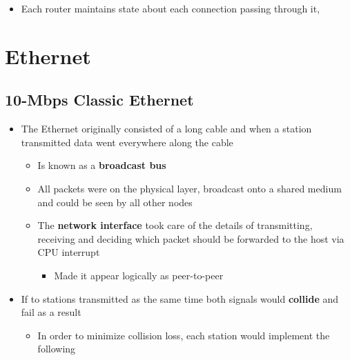 \documentclass[11pt]{article}
\providecommand{\tightlist}{%
      \setlength{\itemsep}{0pt}\setlength{\parskip}{0pt}}
\begin{document}
\begin{itemize}
  \begin{itemize}
  \tightlist
  \item
    Each router maintains state about each connection passing through
    it,
  \end{itemize}
\end{itemize}

    \section{Ethernet}\label{ethernet}

    \subsection{10-Mbps Classic Ethernet}\label{mbps-classic-ethernet}

\begin{itemize}
\tightlist
\item
  The Ethernet originally consisted of a long cable and when a station
  transmitted data went everywhere along the cable

  \begin{itemize}
  \tightlist
  \item
    Is known as a \textbf{broadcast bus}
  \item
    All packets were on the physical layer, broadcast onto a shared
    medium and could be seen by all other nodes
  \item
    The \textbf{network interface} took care of the details of
    transmitting, receiving and deciding which packet should be
    forwarded to the host via CPU interrupt

    \begin{itemize}
    \tightlist
    \item
      Made it appear logically as peer-to-peer
    \end{itemize}
  \end{itemize}
\item
  If to stations transmitted as the same time both signals would
  \textbf{collide} and fail as a result

  \begin{itemize}
  \tightlist
  \item
    In order to minimize collision loss, each station would implement
    the following


\end{itemize}
\end{itemize}
\end{document}
